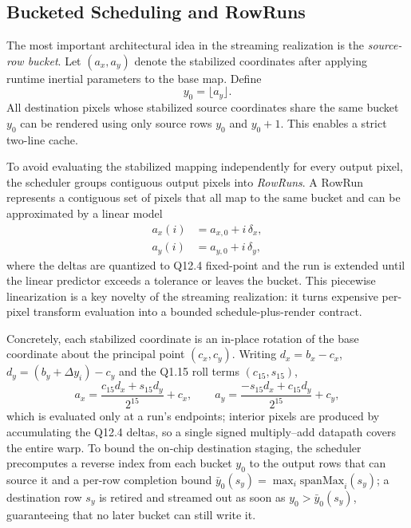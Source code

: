 \documentclass[journal]{IEEEtran}
\begin{document}
\subsection{Bucketed Scheduling and RowRuns}
\label{sec:rowrun}
The most important architectural idea in the streaming realization is the \emph{source-row bucket}. Let $(a_x,a_y)$ denote the stabilized coordinates after applying runtime inertial parameters to the base map. Define
\begin{equation}
 y_0 = \lfloor a_y \rfloor.
\end{equation}
All destination pixels whose stabilized source coordinates share the same bucket $y_0$ can be rendered using only source rows $y_0$ and $y_0+1$. This enables a strict two-line cache.

To avoid evaluating the stabilized mapping independently for every output pixel, the scheduler groups contiguous output pixels into \emph{RowRuns}. A RowRun represents a contiguous set of pixels that all map to the same bucket and can be approximated by a linear model
\begin{align}
 a_x(i) &= a_{x,0} + i\,\delta_x, \\
 a_y(i) &= a_{y,0} + i\,\delta_y,
\end{align}
where the deltas are quantized to Q12.4 fixed-point and the run is extended until the linear predictor exceeds a tolerance or leaves the bucket. This piecewise linearization is a key novelty of the streaming realization: it turns expensive per-pixel transform evaluation into a bounded schedule-plus-render contract.

Concretely, each stabilized coordinate is an in-place rotation of the base coordinate about the principal point $(c_x,c_y)$. Writing $d_x=b_x-c_x$, $d_y=(b_y+\Delta y_i)-c_y$ and the Q1.15 roll terms $(c_{15},s_{15})$,
\begin{equation}
a_x = \frac{c_{15}d_x + s_{15}d_y}{2^{15}}+c_x,\qquad
a_y = \frac{-s_{15}d_x + c_{15}d_y}{2^{15}}+c_y,
\label{eq:fxrot}
\end{equation}
which is evaluated only at a run's endpoints; interior pixels are produced by accumulating the Q12.4 deltas, so a single signed multiply--add datapath covers the entire warp. To bound the on-chip destination staging, the scheduler precomputes a reverse index from each bucket $y_0$ to the output rows that can source it and a per-row completion bound $\bar y_0(s_y)=\max_i \mathrm{spanMax}_i(s_y)$; a destination row $s_y$ is retired and streamed out as soon as $y_0>\bar y_0(s_y)$, guaranteeing that no later bucket can still write it.
\end{document}
